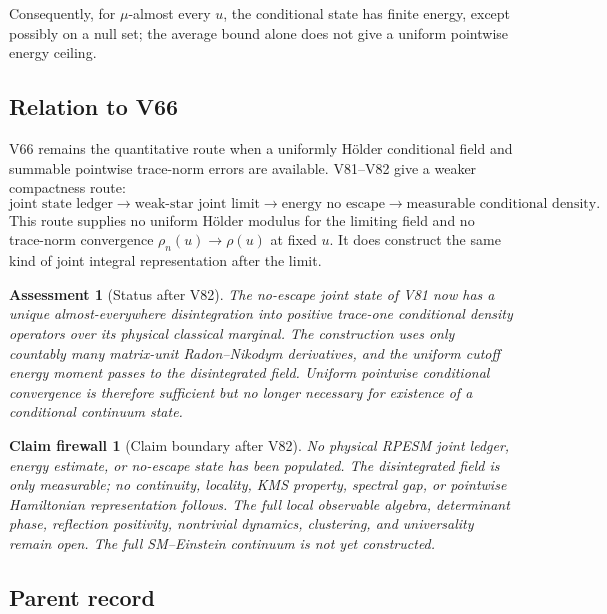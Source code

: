 \documentclass[11pt]{article}
\newtheorem{firewall}[theorem]{Claim firewall}
\newtheorem{assessment}[theorem]{Assessment}
\theoremstyle{remark}
\begin{document}
Consequently, for \(\mu\)-almost every \(u\), the conditional state
has finite energy, except possibly on a null set; the average bound
alone does not give a uniform pointwise energy ceiling.

\subsection{Relation to V66}

V66 remains the quantitative route when a uniformly Hölder
conditional field and summable pointwise trace-norm errors are
available.  V81--V82 give a weaker compactness route:
\[
 \text{joint state ledger}
 \longrightarrow
 \text{weak-star joint limit}
 \longrightarrow
 \text{energy no escape}
 \longrightarrow
 \text{measurable conditional density}.                    \tag{82.16}
\]
This route supplies no uniform Hölder modulus for the limiting field
and no trace-norm convergence \(\rho_n(u)\to\rho(u)\) at fixed
\(u\).  It does construct the same kind of joint integral
representation after the limit.

\begin{assessment}[Status after V82]
\label{ass:v12v82-status}
The no-escape joint state of V81 now has a unique almost-everywhere
disintegration into positive trace-one conditional density
operators over its physical classical marginal.  The construction
uses only countably many matrix-unit Radon--Nikodym derivatives, and
the uniform cutoff energy moment passes to the disintegrated field.
Uniform pointwise conditional convergence is therefore sufficient
but no longer necessary for existence of a conditional continuum
state.
\end{assessment}

\begin{firewall}[Claim boundary after V82]
\label{fire:v12v82-claim}
No physical RPESM joint ledger, energy estimate, or no-escape state
has been populated.  The disintegrated field is only measurable; no
continuity, locality, KMS property, spectral gap, or pointwise
Hamiltonian representation follows.  The full local observable
algebra, determinant phase, reflection positivity, nontrivial
dynamics, clustering, and universality remain open.  The full
SM--Einstein continuum is not yet constructed.
\end{firewall}

\subsection{Parent record}
\end{document}
